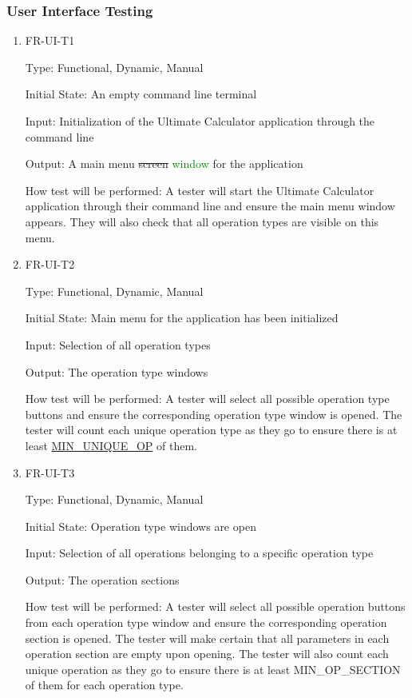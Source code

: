 \documentclass[12pt, titlepage]{article}
\begin{document}
\subsubsection{User Interface Testing}

\begin{enumerate}

\item{FR-UI-T1\\}

Type: Functional, Dynamic, Manual
					
Initial State: An empty command line terminal
					
Input: Initialization of the Ultimate Calculator application through the command line
					
Output: A main menu \sout{screen} \textcolor{Green}{window} for the application
					
How test will be performed: A tester will start the Ultimate Calculator application through their command line and ensure the main menu window appears. They will also check that all operation types are visible on this menu.
					
\item{FR-UI-T2\\}

Type: Functional, Dynamic, Manual
					
Initial State: Main menu for the application has been initialized
					
Input: Selection of all operation types
					
Output: The operation type windows
					
How test will be performed: A tester will select all possible operation type buttons and ensure the corresponding operation type window is opened. The tester will count each unique operation type as they go to ensure there is at least \hyperref[sec:sp]{MIN\_UNIQUE\_OP} of them.

\item{FR-UI-T3\\}

Type: Functional, Dynamic, Manual
					
Initial State: Operation type windows are open
					
Input: Selection of all operations belonging to a specific operation type
					
Output: The operation sections
					
How test will be performed: A tester will select all possible operation buttons from each operation type window and ensure the corresponding operation section is opened. The tester will make certain that all parameters in each operation section are empty upon opening. The tester will also count each unique operation as they go to ensure there is at least MIN\_OP\_SECTION of them for each operation type.



\end{enumerate}
\end{document}
